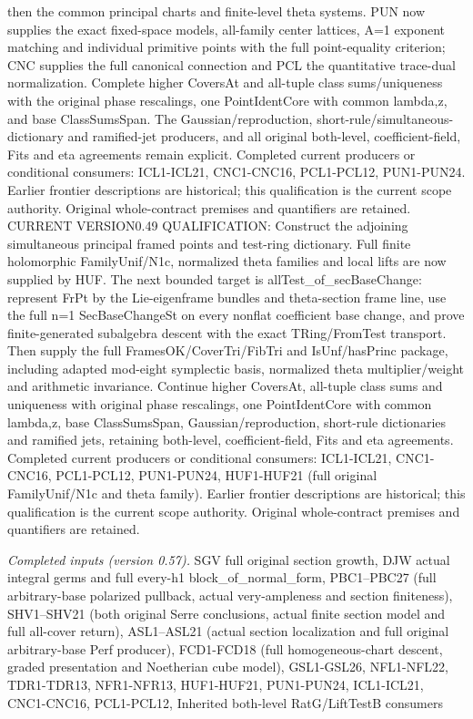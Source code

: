 then the common principal charts and finite-level theta systems. PUN now supplies the exact fixed-space models, all-family center lattices, A=1 exponent matching and individual primitive points with the full point-equality criterion; CNC supplies the full canonical connection and PCL the quantitative trace-dual normalization. Complete higher CoversAt and all-tuple class sums/uniqueness with the original phase rescalings, one PointIdentCore with common lambda,z, and base ClassSumsSpan. The Gaussian/reproduction, short-rule/simultaneous-dictionary and ramified-jet producers, and all original both-level, coefficient-field, Fits and eta agreements remain explicit. Completed current producers or conditional consumers: ICL1-ICL21, CNC1-CNC16, PCL1-PCL12, PUN1-PUN24. Earlier frontier descriptions are historical; this qualification is the current scope authority. Original whole-contract premises and quantifiers are retained. CURRENT VERSION0.49 QUALIFICATION: Construct the adjoining simultaneous principal framed points and test-ring dictionary. Full finite holomorphic FamilyUnif/N1c, normalized theta families and local lifts are now supplied by HUF. The next bounded target is allTest\_\allowbreak of\_\allowbreak secBaseChange: represent FrPt by the Lie-eigenframe bundles and theta-section frame line, use the full n=1 SecBaseChangeSt on every nonflat coefficient base change, and prove finite-generated subalgebra descent with the exact TRing/FromTest transport. Then supply the full FramesOK/CoverTri/FibTri and IsUnf/hasPrinc package, including adapted mod-eight symplectic basis, normalized theta multiplier/weight and arithmetic invariance. Continue higher CoversAt, all-tuple class sums and uniqueness with original phase rescalings, one PointIdentCore with common lambda,z, base ClassSumsSpan, Gaussian/reproduction, short-rule dictionaries and ramified jets, retaining both-level, coefficient-field, Fits and eta agreements. Completed current producers or conditional consumers: ICL1-ICL21, CNC1-CNC16, PCL1-PCL12, PUN1-PUN24, HUF1-HUF21 (full original FamilyUnif/N1c and theta family). Earlier frontier descriptions are historical; this qualification is the current scope authority. Original whole-contract premises and quantifiers are retained.

\emph{Completed inputs (version 0.57).} SGV full original section growth, DJW actual integral germs and full every-h1 block\_\allowbreak of\_\allowbreak normal\_\allowbreak form, PBC1–PBC27 (full arbitrary-base polarized pullback, actual very-ampleness and section finiteness), SHV1–SHV21 (both original Serre conclusions, actual finite section model and full all-cover return), ASL1–ASL21 (actual section localization and full original arbitrary-base Perf producer), FCD1-FCD18 (full homogeneous-chart descent, graded presentation and Noetherian cube model), GSL1-GSL26, NFL1-NFL22, TDR1-TDR13, NFR1-NFR13, HUF1-HUF21, PUN1-PUN24, ICL1-ICL21, CNC1-CNC16, PCL1-PCL12, Inherited both-level RatG/LiftTestB consumers

